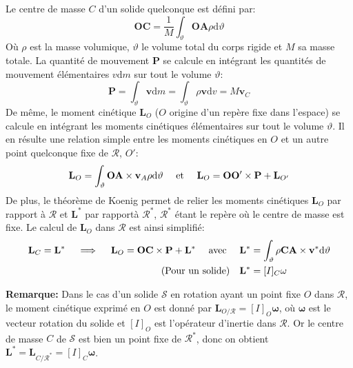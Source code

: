 Le centre de masse $C$ d'un solide quelconque est défini par:
\begin{equation}
\mathbf{OC} = \frac{1}{M} \int_\vartheta \! \mathbf{OA}\rho \mathrm{d} \vartheta
\end{equation}
Où $\rho$ est la masse volumique, $\vartheta$ le volume total du corps rigide et $M$ sa masse totale. La quantité de mouvement $\mathbf{P}$ se calcule en intégrant les quantités de mouvement élémentaires $v \mathrm{d}m$ sur tout le volume $\vartheta$:
\begin{equation}
\mathbf{P} = \int_\vartheta \mathbf{v} \mathrm{d}m = \int_\vartheta \rho \mathbf{v} \mathrm{d}v = M\mathbf{v}_{C}
\end{equation}
De même, le moment cinétique $\mathbf{L}_{O}$ ($O$ origine d'un repère fixe dans l'espace) se calcule en intégrant les moments cinétiques élémentaires sur tout le volume $\vartheta$. Il en résulte une relation simple entre les moments cinétiques en $O$ et un autre point quelconque fixe de $\mathcal{R}$, $O'$:
\begin{equation}\label{momentKantiSym}
\mathbf{L}_O = \int_\vartheta \mathbf{OA} \times \mathbf{v}_A \rho \mathrm{d} \vartheta \quad \textnormal{ et } \quad \mathbf{L}_O = \mathbf{OO'} \times \mathbf{P} + \mathbf{L}_{O'}
\end{equation}
De plus, le théorème de Koenig permet de relier les moments cinétiques $\mathbf{L}_O$ par rapport à $\mathcal{R}$ et $\mathbf{L}^*$ par rapportà  $\mathcal{R^*}$, $\mathcal{R^*}$ étant le repère où le centre de masse est fixe. Le calcul de $\mathbf{L}_O$ dans $\mathcal{R}$ est ainsi simplifié:
\[
\begin{alignedat}{2}
\mathbf{L}_C = \mathbf{L}^* \quad \implies \quad \mathbf{L}_O = \mathbf{OC} \times \mathbf{P} + \mathbf{L}^* \quad \textnormal{ avec } &\quad \mathbf{L}^* &&= \int_\vartheta \rho \mathbf{CA} \times \mathbf{v}^* \mathrm{d} \vartheta \\
\textnormal{(Pour un solide)} &\quad \mathbf{L}^* &&= [I]_C \mathbf{\omega}
\end{alignedat}
\]

\textbf{Remarque:} Dans le cas d'un solide $\mathcal{S}$ en rotation ayant un point fixe $O$ dans $\mathcal{R}$, le moment cinétique exprimé en $O$ est donné par 
\colorbox[gray]{0.8}{\( \mathbf{L}_{O/\mathcal{R}} = [I]_O \mathbf{\omega} \)}, 
où $\mathbf{\omega}$ est le vecteur rotation du solide et $[I]_O$ est l'opérateur d'inertie dans $\mathcal{R}$. Or le centre de masse $C$ de $\mathcal{S}$ est bien un point fixe de $\mathcal{R^*}$, donc on obtient \colorbox[gray]{0.8}{\( \mathbf{L^*} = \mathbf{L}_{C/\mathcal{R^*}} = [I]_C \mathbf{\omega} \)}.

